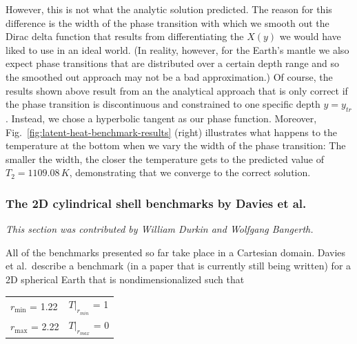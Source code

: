 \documentclass{article}
\begin{document}
However, this is not what the analytic solution
predicted. The reason for this difference is the width of the phase transition
with which we smooth out the Dirac delta function that results from
differentiating the $X(y)$ we would have liked to use in an ideal world.
(In reality, however, for the Earth's mantle we also expect phase transitions
that are distributed over a certain depth range and so the smoothed out
approach may not be a bad approximation.)
Of course, the results shown above result from an the analytical approach that
is only correct if the phase transition is discontinuous and constrained to one
specific depth $y=y_{tr}$. Instead, we chose a hyperbolic
tangent as our phase function. Moreover,
Fig.~\ref{fig:latent-heat-benchmark-results} (right) illustrates what happens to
the temperature at the bottom when we vary the width of the phase transition:
The smaller the width, the closer the temperature gets to the predicted value of
$T_2 = 1109.08 \, \si{K}$, demonstrating that we converge to the correct
solution.


\subsubsection{The 2D cylindrical shell benchmarks by Davies et al.}
\label{sec:benchmark-2D_cylindrical_shell}

\textit{This section was contributed by William Durkin and Wolfgang Bangerth.}

All of the benchmarks presented so far take place in a Cartesian domain.
Davies et al.~describe a benchmark (in a paper that is currently still being
written) for a 2D spherical Earth that is
nondimensionalized such that
\begin{table}[h]
 \centering
 \begin{tabular}{ l l }
    $r_{\min}$ = 1.22 &  $\left. T \right|_{r_{min}}$ = 1 \\
    $r_{\max}$ = 2.22 &  $\left. T \right|_{r_{max}}$ = 0
 \end{tabular}
\end{table}
\end{document}
